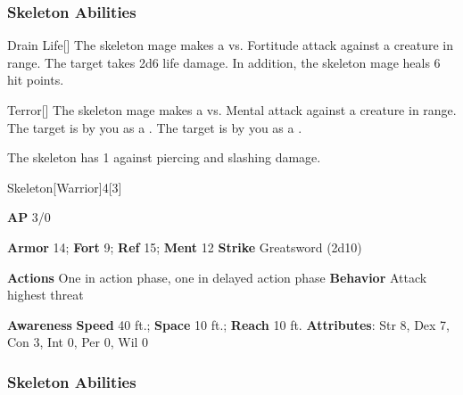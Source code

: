 \subsubsection{Skeleton Abilities}

\begin{freeability}{Drain Life}[]
The skeleton mage makes a  vs. Fortitude attack against a creature in \rngmed range.
\hit The target takes 2d6 life damage.
In addition, the skeleton mage heals 6 hit points.
\end{freeability}

\vspace{0.5em}
\begin{freeability}{Terror}[]
The skeleton mage makes a  vs. Mental attack against a creature in \rngmed range.
\hit The target is \frightened by you as a .
\crit The target is \panicked by you as a .
\end{freeability}

The skeleton has  1 against piercing and slashing damage.

\begin{monsection}{Skeleton}[Warrior]{4}[3]
\vspace{-1em}\vspace{-1em}
\begin{spellcontent}
\begin{spelltargetinginfo}
{\textbf{AP} 3/0}

\pari \textbf{Armor} 14;
\textbf{Fort} 9;
\textbf{Ref} 15;
\textbf{Ment} 12
\pari \textbf{Strike} Greatsword  (2d10)


\pari \textbf{Actions} One in action phase, one in delayed action phase
\pari \textbf{Behavior} Attack highest threat
\end{spelltargetinginfo}
\end{spellcontent}

\begin{monsterfooter}
\pari \textbf{Awareness} 
\pari \textbf{Speed} 40 ft.;
\textbf{Space} 10 ft.;
\textbf{Reach} 10 ft.
\pari \textbf{Attributes}:
Str 8,
Dex 7,
Con 3,
Int 0,
Per 0,
Wil 0
\end{monsterfooter}
\end{monsection}


\subsubsection{Skeleton Abilities}

